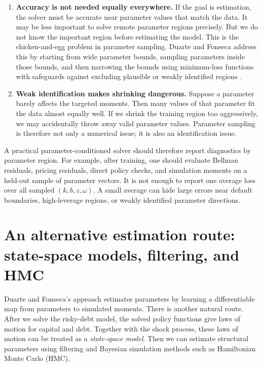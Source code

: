 \documentclass[11pt]{article}
\newcommand{\1}{\mathbf{1}}
\begin{document}
\begin{enumerate}[leftmargin=2em]
  \item \textbf{Accuracy is not needed equally everywhere.} If the goal is
  estimation, the solver must be accurate near parameter values that match the
  data. It may be less important to solve remote parameter regions precisely.
  But we do not know the important region before estimating the model. This is
  the chicken-and-egg problem in parameter sampling. Duarte and Fonseca address
  this by starting from wide parameter bounds, sampling parameters inside those
  bounds, and then narrowing the bounds using minimum-loss functions with
  safeguards against excluding plausible or weakly identified regions
  \citep[Sections 3.5--3.6 and Appendix A.9]{duartefonseca2026ai}.

  \item \textbf{Weak identification makes shrinking dangerous.} Suppose a
  parameter barely affects the targeted moments. Then many values of that
  parameter fit the data almost equally well. If we shrink the training region
  too aggressively, we may accidentally throw away valid parameter values.
  Parameter sampling is therefore not only a numerical issue; it is also an
  identification issue.
\end{enumerate}

A practical parameter-conditioned solver should therefore report diagnostics
by parameter region. For example, after training, one should evaluate Bellman
residuals, pricing residuals, direct policy checks, and simulation moments on a
held-out sample of parameter vectors. It is not enough to report one average
loss over all sampled \((k,b,z,\omega)\). A small average can hide large errors
near default boundaries, high-leverage regions, or weakly identified parameter
directions.

\section{An alternative estimation route: state-space models, filtering, and HMC}
\label{sec:ssm-hmc-estimation}

Duarte and Fonseca's approach estimates parameters by learning a differentiable
map from parameters to simulated moments. There is another natural route. After
we solve the risky-debt model, the solved policy functions give laws of motion
for capital and debt. Together with the shock process, these laws of motion can
be treated as a \emph{state-space model}. Then we can estimate structural
parameters using filtering and Bayesian simulation methods such as Hamiltonian
Monte Carlo (HMC).
\end{document}

